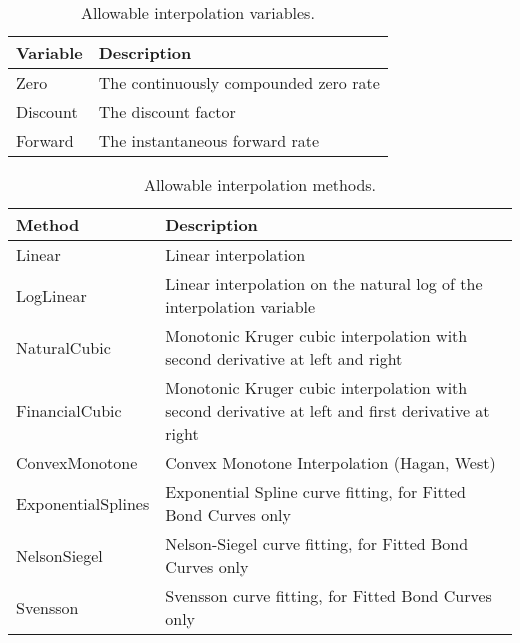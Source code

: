 \begin{table}[h]
\centering
  \begin{tabu} to 0.9\linewidth {| X[-1.5,l,m] | X[-5,l,m] |}
    \hline
    \bfseries{Variable} & \bfseries{Description} \\
    \hline
    Zero & The continuously compounded zero rate \\ \hline
    Discount & The discount factor \\ \hline
    Forward & The instantaneous forward rate \\ \hline
  \end{tabu}
  \caption{Allowable interpolation variables.}
  \label{tab:allow_interp_variables}
\end{table}

\begin{table}[h]
\centering
  \begin{tabu} to 0.9\linewidth {| X[-1.5,l,m] | X[-5,l,m] |}
    \hline
    \bfseries{Method} & \bfseries{Description} \\
    \hline
    Linear & Linear interpolation \\ \hline
    LogLinear & Linear interpolation on the natural log of the interpolation variable \\ \hline
    NaturalCubic & Monotonic Kruger cubic interpolation with second derivative at left and right \\ \hline
    FinancialCubic & Monotonic Kruger cubic interpolation with second derivative at left and 
                     first derivative at right \\ \hline
    ConvexMonotone & Convex Monotone Interpolation (Hagan, West) \\ \hline
    ExponentialSplines & Exponential Spline curve fitting, for Fitted Bond Curves only \\ \hline
    NelsonSiegel & Nelson-Siegel curve fitting, for Fitted Bond Curves only \\ \hline
    Svensson & Svensson curve fitting, for Fitted Bond Curves only \\ \hline
  \end{tabu}
  \caption{Allowable interpolation methods.}
  \label{tab:allow_interp_methods}
\end{table}
